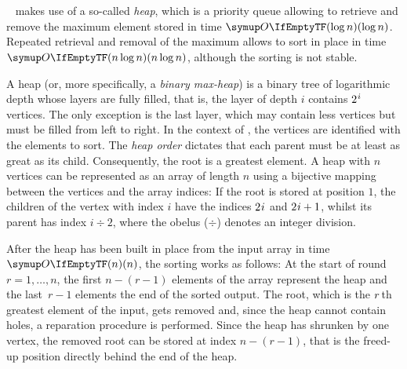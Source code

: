 \section{\texorpdfstring{\HS{}}{HeapSort}}
\label{sec:tasklet:heap}

\HS{}~\cites{floyd1964treesort}{williams1964heapsort}[Chapter~2.2.5]{wirth1975algorithmen} makes use of a so-called \emph{heap}, which is a priority queue allowing to retrieve and remove the maximum element stored in time \(\bigoh{\log n}\).
Repeated retrieval and removal of the maximum allows to sort in place in time \(\bigoh{n \log n}\), although the sorting is not stable.

A heap (or, more specifically, a \emph{binary max-heap}) is a binary tree of logarithmic depth whose layers are fully filled, that is, the layer of depth \(i\) contains \(2\mspace{1mu}^i\) vertices.
The only exception is the last layer, which may contain less vertices but must be filled from left to right.
In the context of \HS{}, the vertices are identified with the elements to sort.
The \emph{heap order} dictates that each parent must be at least as great as its child.
Consequently, the root is a greatest element.
A heap with \(n\) vertices can be represented as an array of length \(n\) using a bijective mapping between the vertices and the array indices:
If the root is stored at position \(1\), the children of the vertex with index \(i\) have the indices \(2 \mspace{1mu} i\) and \(2 \mspace{1mu} i + 1\), whilst its parent has index \(i \div 2\), where the obelus (\(\div\)) denotes an integer division.

After the heap has been built in place from the input array in time \(\bigoh{n}\), the sorting works as follows:
At the start of round~\(r = 1, \dots, n\), the first \(n - (r - 1)\) elements of the array represent the heap and the last~\(r - 1\) elements the end of the sorted output.
The root, which is the \(r\kern .125em\)th greatest element of the input, gets removed and, since the heap cannot contain holes, a reparation procedure is performed.
Since the heap has shrunken by one vertex, the removed root can be stored at index \(n - (r - 1)\), that is the freed-up position directly behind the end of the heap.






